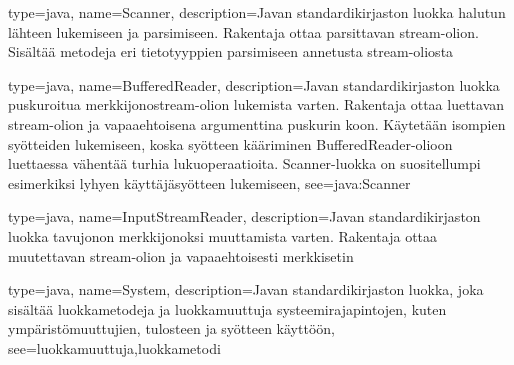{
	type=java,
	name=Scanner,
	description={Javan standardikirjaston luokka halutun lähteen lukemiseen ja parsimiseen.
Rakentaja ottaa parsittavan stream-olion. Sisältää metodeja eri tietotyyppien parsimiseen annetusta
stream-oliosta}
}

{
	type=java,
	name=BufferedReader,
	description={Javan standardikirjaston luokka puskuroitua merkkijonostream-olion lukemista
varten. Rakentaja ottaa luettavan stream-olion ja vapaaehtoisena argumenttina puskurin koon.
Käytetään isompien syötteiden lukemiseen, koska syötteen kääriminen BufferedReader-olioon
luettaessa vähentää turhia lukuoperaatioita. Scanner-luokka on suositellumpi esimerkiksi
lyhyen käyttäjäsyötteen lukemiseen},
	see=java:Scanner
}

{
	type=java,
	name=InputStreamReader,
	description={Javan standardikirjaston luokka tavujonon merkkijonoksi muuttamista varten.
Rakentaja ottaa muutettavan stream-olion ja vapaaehtoisesti merkkisetin}
}

{
	type=java,
	name=System,
	description={Javan standardikirjaston luokka, joka sisältää luokkametodeja ja luokkamuuttuja
systeemirajapintojen, kuten ympäristömuuttujien, tulosteen ja syötteen käyttöön},
	see={luokkamuuttuja,luokkametodi}
}